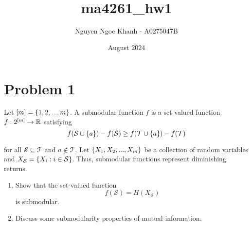\documentclass{article}
\title{ma4261\_hw1}
\author{Nguyen Ngoc Khanh - A0275047B}
\date{August 2024}
\begin{document}
\maketitle

\section{Problem 1}

Let $[m] = \{1, 2, ..., m\}$. A submodular function $f$ is a set-valued function $f: 2^{[m]} \to \mathbb{R}$ satisfying 
$$
    f(\mathcal{S} \cup \{a\}) - f(\mathcal{S}) \geq f(\mathcal{T} \cup \{a\}) - f(\mathcal{T})
$$

for all $\mathcal{S} \subseteq \mathcal{T}$ and $a \notin \mathcal{T}$. Let $\{X_1, X_2, ..., X_m\}$ be a collection of random variables and $X_\mathcal{S} = \{X_i: i \in \mathcal{S}\}$. Thus, submodular functions represent diminishing returns.
\begin{enumerate}
    \item Show that the set-valued function
    $$
        f(\mathcal{S}) = H(X_\mathcal{S})
    $$
    is submodular.

    \item Discuss some submodularity properties of mutual information.
\end{enumerate}
\end{document}
